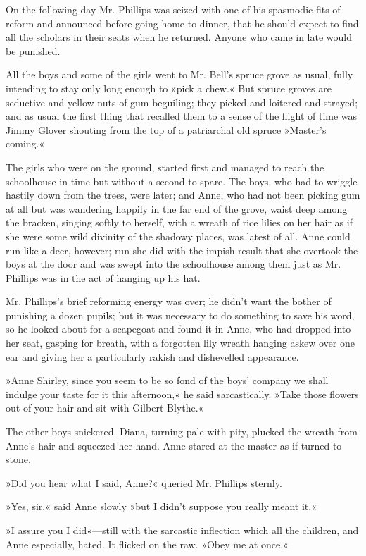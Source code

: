 On the following day Mr. Phillips was seized with one of his spasmodic fits of reform and announced before going home to dinner, that he should expect to find all the scholars in their seats when he returned. Anyone who came in late would be punished.

All the boys and some of the girls went to Mr. Bell's spruce grove as usual, fully intending to stay only long enough to »pick a chew.« But spruce groves are seductive and yellow nuts of gum beguiling; they picked and loitered and strayed; and as usual the first thing that recalled them to a sense of the flight of time was Jimmy Glover shouting from the top of a patriarchal old spruce »Master's coming.«

The girls who were on the ground, started first and managed to reach the schoolhouse in time but without a second to spare. The boys, who had to wriggle hastily down from the trees, were later; and Anne, who had not been picking gum at all but was wandering happily in the far end of the grove, waist deep among the bracken, singing softly to herself, with a wreath of rice lilies on her hair as if she were some wild divinity of the shadowy places, was latest of all. Anne could run like a deer, however; run she did with the impish result that she overtook the boys at the door and was swept into the schoolhouse among them just as Mr. Phillips was in the act of hanging up his hat.

Mr. Phillips's brief reforming energy was over; he didn't want the bother of punishing a dozen pupils; but it was necessary to do something to save his word, so he looked about for a scapegoat and found it in Anne, who had dropped into her seat, gasping for breath, with a forgotten lily wreath hanging askew over one ear and giving her a particularly rakish and dishevelled appearance.

»Anne Shirley, since you seem to be so fond of the boys' company we shall indulge your taste for it this afternoon,« he said sarcastically. »Take those flowers out of your hair and sit with Gilbert Blythe.«

The other boys snickered. Diana, turning pale with pity, plucked the wreath from Anne's hair and squeezed her hand. Anne stared at the master as if turned to stone.

»Did you hear what I said, Anne?« queried Mr. Phillips sternly.

»Yes, sir,« said Anne slowly »but I didn't suppose you really meant it.«

»I assure you I did«—still with the sarcastic inflection which all the children, and Anne especially, hated. It flicked on the raw. »Obey me at once.«

